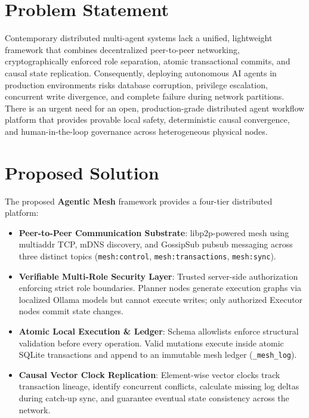 \documentclass[12pt,a4paper]{report}
\begin{document}
\section{Problem Statement}
Contemporary distributed multi-agent systems lack a unified, lightweight framework that combines decentralized peer-to-peer networking, cryptographically enforced role separation, atomic transactional commits, and causal state replication. Consequently, deploying autonomous AI agents in production environments risks database corruption, privilege escalation, concurrent write divergence, and complete failure during network partitions. There is an urgent need for an open, production-grade distributed agent workflow platform that provides provable local safety, deterministic causal convergence, and human-in-the-loop governance across heterogeneous physical nodes.

\section{Proposed Solution}
The proposed \textbf{Agentic Mesh} framework provides a four-tier distributed platform:
\begin{itemize}[leftmargin=*,itemsep=2pt]
    \item \textbf{Peer-to-Peer Communication Substrate}: libp2p-powered mesh using multiaddr TCP, mDNS discovery, and GossipSub pubsub messaging across three distinct topics (\texttt{mesh:control}, \texttt{mesh:transactions}, \texttt{mesh:sync}).
    \item \textbf{Verifiable Multi-Role Security Layer}: Trusted server-side authorization enforcing strict role boundaries. Planner nodes generate execution graphs via localized Ollama models but cannot execute writes; only authorized Executor nodes commit state changes.
    \item \textbf{Atomic Local Execution \& Ledger}: Schema allowlists enforce structural validation before every operation. Valid mutations execute inside atomic SQLite transactions and append to an immutable mesh ledger (\texttt{\_mesh\_log}).
    \item \textbf{Causal Vector Clock Replication}: Element-wise vector clocks track transaction lineage, identify concurrent conflicts, calculate missing log deltas during catch-up sync, and guarantee eventual state consistency across the network.
\end{itemize}

\end{document}
